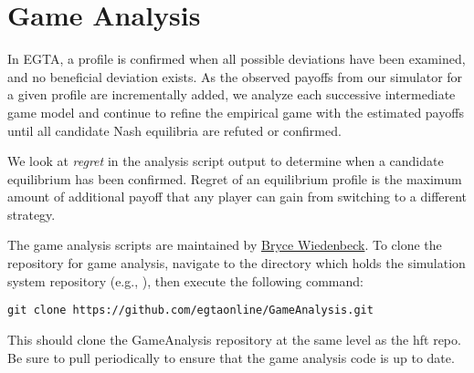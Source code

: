 \documentclass[11pt]{article}
\begin{document}
\section{Game Analysis}\label{sec:analysis}

In EGTA, a profile is confirmed when all possible deviations have been examined, and no beneficial deviation exists.
As the observed payoffs from our simulator for a given profile are incrementally added, we analyze each successive intermediate game model and continue to refine the empirical game with the estimated payoffs until all candidate Nash equilibria are refuted or confirmed.

We look at \emph{regret} in the analysis script output to determine when a candidate equilibrium has been confirmed. Regret of an equilibrium profile is the maximum amount of additional payoff that any player can gain from switching to a different strategy.

The game analysis scripts are maintained by \href{mailto:btwied@umich.edu}{Bryce Wiedenbeck}. To clone the repository for game analysis, navigate to the directory which holds the simulation system repository (e.g., ), then execute the following command:
\begin{verbatim}
git clone https://github.com/egtaonline/GameAnalysis.git
\end{verbatim}
This should clone the GameAnalysis repository at the same level as the hft repo.
Be sure to pull periodically to ensure that the game analysis code is up to date.
\end{document}
